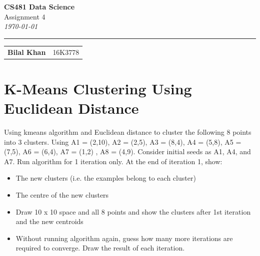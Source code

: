 \documentclass[12pt]{article}
\begin{document}
\begin{flushright}
	\Huge{\textbf{CS481 Data Science}} \\
	\Large{Assignment 4} \\
	\emph{\large{\today}} \\
	\centering \rule{450pt}{1pt}
	\begin{table}[h!]
		\begin{center}
			\begin{tabular}{lr}
				\large{\textbf{Bilal Khan}} & \large{16K3778}
			\end{tabular}
		\end{center}
	\end{table}
\end{flushright}

\section{K-Means Clustering Using Euclidean Distance}

Using kmeans algorithm and Euclidean distance to cluster the following 8 points into 3 clusters. Using A1 = (2,10), A2 = (2,5), A3 = (8,4), A4 = (5,8), A5 = (7,5), A6 = (6,4), A7 = (1,2) , A8 = (4,9). Consider initial seeds as A1, A4, and A7. Run algorithm for 1 iteration only. At the end of iteration 1, show:
\begin{itemize}
	\item The new clusters (i.e. the examples belong to each cluster)
	\item The centre of the new clusters
	\item Draw 10 x 10 space and all 8 points and show the clusters after 1st iteration and the new centroids
	\item Without running algorithm again, guess how many more iterations are required to converge. Draw the result of each iteration.
\end{itemize}
\end{document}
